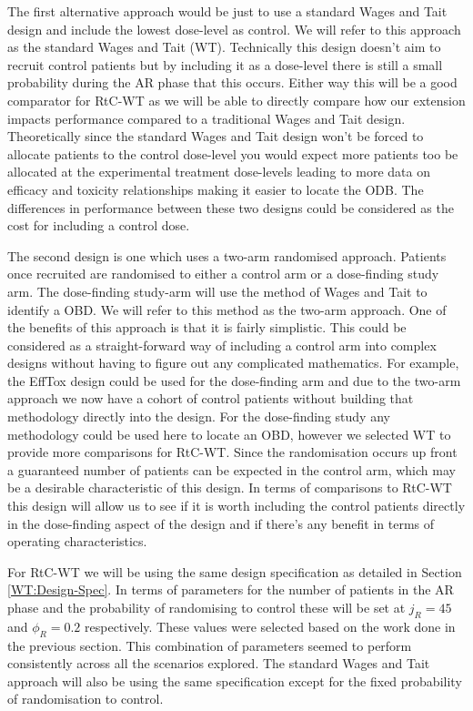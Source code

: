  The first alternative approach would be just to use a standard Wages and Tait design and include the lowest dose-level as control. We will refer to this approach as the standard Wages and Tait (WT). Technically this design doesn't aim to recruit control patients but by including it as a dose-level there is still a small probability during the AR phase that this occurs. Either way this will be a good comparator for RtC-WT as we will be able to directly compare how our extension impacts performance compared to a traditional Wages and Tait design. Theoretically since the standard Wages and Tait design won't be forced to allocate patients to the control dose-level you would expect more patients too be allocated at the experimental treatment dose-levels leading to more data on efficacy and toxicity relationships making it easier to locate the ODB. The differences in performance between these two designs could be considered as the cost for including a control dose. 
 
 The second design is one which uses a two-arm randomised approach. Patients once recruited are randomised to either a control arm or a dose-finding study arm. The dose-finding study-arm will use the method of Wages and Tait to identify a OBD. We will refer to this method as the two-arm approach. One of the benefits of this approach is that it is fairly simplistic. This could be considered as a straight-forward way of including a control arm into complex designs without having to figure out any complicated mathematics. For example, the EffTox design could be used for the dose-finding arm and due to the two-arm approach we now have a cohort of control patients without building that methodology directly into the design. For the dose-finding study any methodology could be used here to locate an OBD, however we selected WT to provide more comparisons for RtC-WT. Since the randomisation occurs up front a guaranteed number of patients can be expected in the control arm, which may be a desirable characteristic of this design. In terms of comparisons to RtC-WT this design will allow us to see if it is worth including the control patients directly in the dose-finding aspect of the design and if there's any benefit in terms of operating characteristics.  
 
 For RtC-WT we will be using the same design specification as detailed in Section \ref{WT:Design-Spec}. In terms of parameters for the number of patients in the AR phase and the probability of randomising to control these will be set at $j_R = 45 $ and $\phi_R = 0.2 $ respectively. These values were selected based on the work done in the previous section. This combination of parameters seemed to perform consistently across all the scenarios explored. The standard Wages and Tait approach will also be using the same specification except for the fixed probability of randomisation to control.
 

